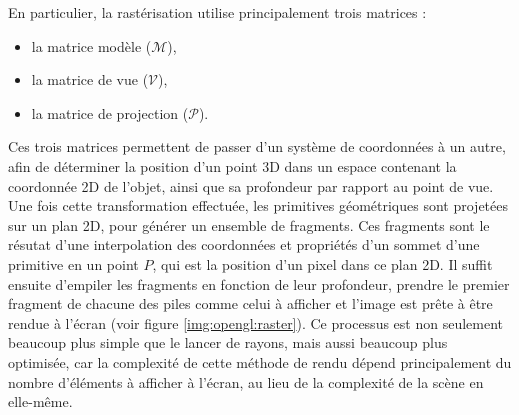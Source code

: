 {{        En particulier, la rastérisation utilise principalement trois matrices :\begin{itemize}
            \item la matrice modèle ($\mathcal{M}$),
            \item la matrice de vue ($\mathcal{V}$),
            \item la matrice de projection ($\mathcal{P}$).
        \end{itemize}

        Ces trois matrices permettent de passer d'un système de coordonnées à un autre, afin de déterminer la position d'un point 3D dans un espace contenant la coordonnée 2D de l'objet, ainsi que sa profondeur par rapport au point de vue. Une fois cette transformation effectuée, les primitives géométriques sont projetées sur un plan 2D, pour générer un ensemble de fragments. Ces fragments sont le résutat d'une interpolation des coordonnées et propriétés d'un sommet d'une primitive en un point $P$, qui est la position d'un pixel dans ce plan 2D. Il suffit ensuite d'empiler les fragments en fonction de leur profondeur, prendre le premier fragment de chacune des piles comme celui à afficher et l'image est prête à être rendue à l'écran (voir figure \ref{img:opengl:raster}). Ce processus est non seulement beaucoup plus simple que le lancer de rayons, mais aussi beaucoup plus optimisée, car la complexité de cette méthode de rendu dépend principalement du nombre d'éléments à afficher à l'écran, au lieu de la complexité de la scène en elle-même.

}}
